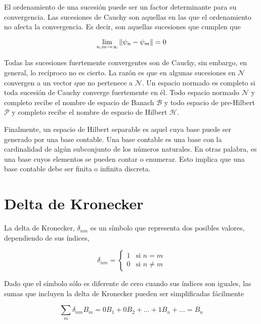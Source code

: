 El ordenamiento de una sucesión puede ser un factor determinante para su convergencia. Las sucesiones de Cauchy son aquellas en las que el ordenamiento no afecta la convergencia. Es decir, son aquellas sucesiones que cumplen que

\begin{equation}
    \lim_{n,m \to \infty} \norm{\psi_n - \psi_m} = 0
\end{equation}

Todas las sucesiones fuertemente convergentes son de Cauchy, sin embargo, en general, lo recíproco no es cierto. La razón es que en algunas sucesiones en $\mathcal{N}$ convergen a un vector que no pertenece a $\mathcal{N}$. Un espacio normado es completo si toda sucesión de Cauchy converge fuertemente en él. Todo espacio normado $\mathcal{N}$ y completo recibe el nombre de espacio de Banach $\mathcal{B}$ y todo espacio de pre-Hilbert $\mathcal{P}$ y completo recibe el nombre de espacio de Hilbert $\mathcal{H}$.

Finalmente, un espacio de Hilbert separable es aquel cuya base puede ser generado por una base contable. Una base contable es una base con la cardinalidad de algún subconjunto de los números naturales. En otras palabra, es una base cuyos elementos se pueden contar o enumerar. Esto implica que una base contable debe ser finita o infinita discreta.

\section{Delta de Kronecker}

La delta de Kronecker, $\delta_{nm}$ es un símbolo que representa dos posibles valores, dependiendo de sus índices,

\begin{equation}
    \delta_{nm} =
    \begin{cases}
        1 & \text{si } n = m \\
        0 & \text{si } n \neq m
    \end{cases}
\end{equation}

Dado que el símbolo sólo es diferente de cero cuando sus índices son iguales, las sumas que incluyen la delta de Kronecker pueden ser simplificadas fácilmente

\begin{equation*}
    \sum\limits_m \delta_{nm} B_m = 0 B_1 + 0 B_2 + ... + 1 B_n + ... = B_n
\end{equation*}

